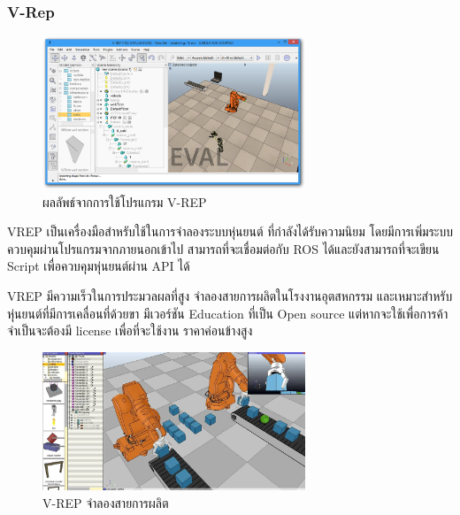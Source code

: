 \clearpage
\subsubsection*{V-Rep}
\begin{figure}[!ht]
    \centering
    \includegraphics[width=0.7\textwidth]{chapter2/images/sim_vrep.png}
    \caption{ผลลัพธ์จากการใช้โปรแกรม V-REP}
    \label{fig:sim_vrep}
\end{figure}
VREP เป็นเครื่องมือสำหรับใช้ในการจำลองระบบหุ่นยนต์ ที่กำลังได้รับความนิยม โดยมีการเพิ่มระบบควบคุมผ่านโปรแกรมจากภายนอกเข้าไป สามารถที่จะเชื่อมต่อกับ ROS ได้และยังสามารถที่จะเขียน Script
เพื่อควบคุมหุ่นยนต์ผ่าน API ได้ 

VREP มีความเร็วในการประมวลผลที่สูง จำลองสายการผลิตในโรงงานอุตสหกรรม และเหมาะสำหรับหุ่นยนต์ที่มีการเคลื่อนที่ด้วยขา
มีเวอร์ชัน Education ที่เป็น Open source แต่หากจะใช้เพื่อการค้าจำเป็นจะต้องมี license เพื่อที่จะใช้งาน ราคาค่อนข้างสูง
\begin{figure}[!ht]
    \centering
    \includegraphics[width=0.7\textwidth]{chapter2/images/sim_vrep.jpg}
    \caption{V-REP จำลองสายการผลิต}
    \label{fig:sim_vrep2}
\end{figure}

\clearpage
